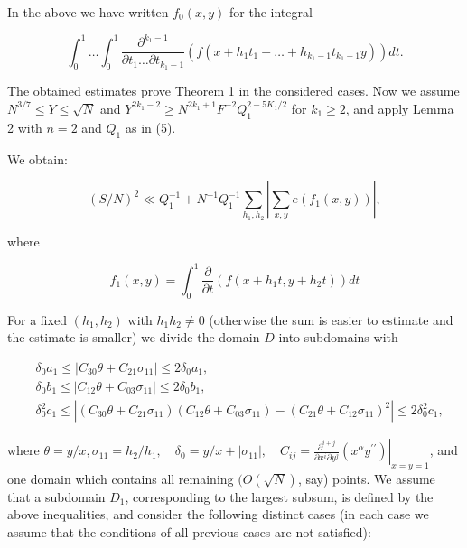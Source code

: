 \documentclass[10pt]{article}
\begin{document}
In the above we have written $f_{0}(x, y)$ for the integral

$$
\int_{0}^{1} \ldots \int_{0}^{1} \frac{\partial^{k_{1}-1}}{\partial t_{1} \ldots \partial t_{k_{1}-1}}\left(f\left(x+h_{1} t_{1}+\ldots+h_{k_{1}-1} t_{k_{1}-1} y\right)\right) d t .
$$

The obtained estimates prove Theorem 1 in the considered cases. Now we assume $N^{3 / 7} \leqslant Y \leqslant \sqrt{N}$ and $Y^{2 k_{1}-2} \geqslant N^{2 k_{1}+1} F^{-2} Q_{1}^{2-5 K_{1} / 2}$ for $k_{1} \geqslant 2$, and apply Lemma 2 with $n=2$ and $Q_{1}$ as in (5).

We obtain:

$$
(S / N)^{2} \ll Q_{1}^{-1}+N^{-1} Q_{1}^{-1} \sum_{h_{1}, h_{2}}\left|\sum_{x, y} e\left(f_{1}(x, y)\right)\right|,
$$

where

$$
f_{1}(x, y)=\int_{0}^{1} \frac{\partial}{\partial t}\left(f\left(x+h_{1} t, y+h_{2} t\right)\right) d t
$$

For a fixed $\left(h_{1}, h_{2}\right)$ with $h_{1} h_{2} \neq 0$ (otherwise the sum is easier to estimate and the estimate is smaller) we divide the domain $D$ into subdomains with

$$
\begin{aligned}
& \delta_{0} a_{1} \leqslant\left|C_{30} \theta+C_{21} \sigma_{11}\right| \leqslant 2 \delta_{0} a_{1}, \\
& \delta_{0} b_{1} \leqslant\left|C_{12} \theta+C_{03} \sigma_{11}\right| \leqslant 2 \delta_{0} b_{1}, \\
& \delta_{0}^{2} c_{1} \leqslant\left|\left(C_{30} \theta+C_{21} \sigma_{11}\right)\left(C_{12} \theta+C_{03} \sigma_{11}\right)-\left(C_{21} \theta+C_{12} \sigma_{11}\right)^{2}\right| \leqslant 2 \delta_{0}^{2} c_{1},
\end{aligned}
$$

where $\theta=y / x, \sigma_{11}=h_{2} / h_{1}, \quad \delta_{0}=y / x+\left|\sigma_{11}\right|, \quad C_{i j}=\left.\frac{\partial^{i+j}}{\partial x^{i} \partial y^{j}}\left(x^{\alpha} y^{\prime \prime}\right)\right|_{x=y=1}$, and one domain which contains all remaining $(O(\sqrt{N})$, say) points. We assume that a subdomain $D_{1}$, corresponding to the largest subsum, is defined by the above inequalities, and consider the following distinct cases (in each case we assume that the conditions of all previous cases are not satisfied):
\end{document}
